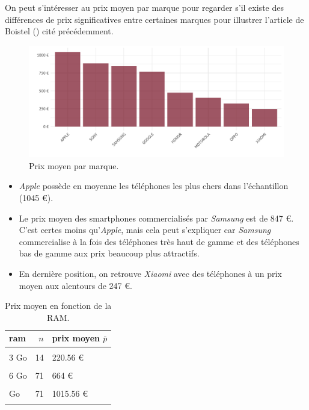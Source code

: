 \documentclass[
  12pt,
]{report}
\begin{document}
On peut s'intéresser au prix moyen par marque pour regarder s'il existe
des différences de prix significatives entre certaines marques pour
illustrer l'article de Boistel () cité
précédemment.

\begin{figure}[H]

{\centering \includegraphics{report_files/figure-pdf/fig_mean_price-1.pdf}

}

\caption{Prix moyen par marque.}

\end{figure}%

\begin{itemize}
\item
  \emph{Apple} possède en moyenne les téléphones les plus chers dans
  l'échantillon (1045 €).
\item
  Le prix moyen des smartphones commercialisés par \emph{Samsung} est de
  847 €. C'est certes moins qu'\emph{Apple}, mais cela peut s'expliquer
  car \emph{Samsung} commercialise à la fois des téléphones très haut de
  gamme et des téléphones bas de gamme aux prix beaucoup plus
  attractifs.
\item
  En dernière position, on retrouve \emph{Xiaomi} avec des téléphones à
  un prix moyen aux alentours de 247 €.
\end{itemize}

\newpage

\begin{table}[!h]

\caption{\label{tab:kable_1}Prix moyen en fonction de la RAM.}
\centering
\begin{tabular}[t]{lrl}
\toprule
\textbf{ram} & \textbf{$n$} & \textbf{prix moyen $\bar p$}\\
\midrule
\cellcolor{gray!6}{2 Go} & \cellcolor{gray!6}{14} & \cellcolor{gray!6}{95.86 €}\\
3 Go & 14 & 220.56 €\\
\cellcolor{gray!6}{4 Go} & \cellcolor{gray!6}{105} & \cellcolor{gray!6}{402.31 €}\\
6 Go & 71 & 664 €\\
\cellcolor{gray!6}{8 Go} & \cellcolor{gray!6}{155} & \cellcolor{gray!6}{758.59 €}\\
\addlinespace
12 Go & 71 & 1015.56 €\\
\cellcolor{gray!6}{16 Go} & \cellcolor{gray!6}{2} & \cellcolor{gray!6}{1499 €}\\
\bottomrule
\end{tabular}
\end{table}
\end{document}
